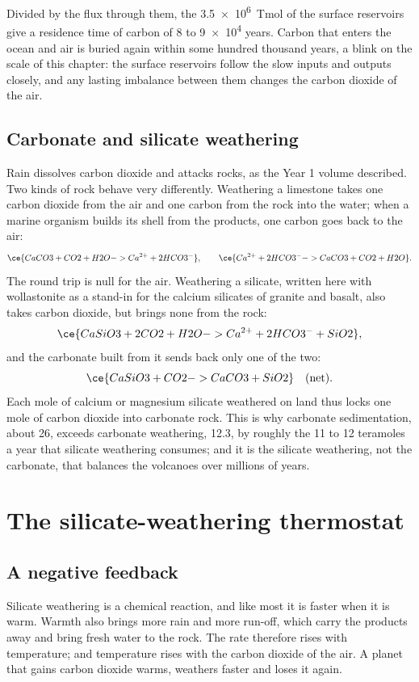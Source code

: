 Divided by the flux through them, the \qty{3.5e6}{Tmol} of the surface reservoirs give a
residence time of carbon of 8 to \num{9e4} years. Carbon that enters the ocean and air is buried
again within some hundred thousand years, a blink on the scale of this chapter: the surface
reservoirs follow the slow inputs and outputs closely, and any lasting imbalance between them
changes the carbon dioxide of the air.

\subsection*{Carbonate and silicate weathering}

Rain dissolves carbon dioxide and attacks rocks, as the Year 1 volume described. Two kinds of rock
behave very differently. Weathering a limestone takes one carbon dioxide from the air and one
carbon from the rock into the water; when a marine organism builds its shell from the products,
one carbon goes back to the air:
\[
  \ce{CaCO3 + CO2 + H2O -> Ca^{2+} + 2 HCO3^-} , \qquad
  \ce{Ca^{2+} + 2 HCO3^- -> CaCO3 + CO2 + H2O} .
\]
The round trip is null for the air. Weathering a silicate, written here with wollastonite as a
stand-in for the calcium silicates of granite and basalt, also takes carbon dioxide, but brings
none from the rock:
\[
  \ce{CaSiO3 + 2 CO2 + H2O -> Ca^{2+} + 2 HCO3^- + SiO2} ,
\]
and the carbonate built from it sends back only one of the two:
\[
  \ce{CaSiO3 + CO2 -> CaCO3 + SiO2} \quad\text{(net)} .
\]
Each mole of calcium or magnesium silicate weathered on land thus locks one mole of carbon dioxide
into carbonate rock. This is why carbonate sedimentation, about 26, exceeds carbonate weathering,
12.3, by roughly the 11 to 12 teramoles a year that silicate weathering consumes; and it is the
silicate weathering, not the carbonate, that balances the volcanoes over millions of years.

\section{The silicate-weathering thermostat}\label{sec:b2:deep-time-climate:thermostat}

\subsection*{A negative feedback}

Silicate weathering is a chemical reaction, and like most it is faster when it is warm. Warmth
also brings more rain and more run-off, which carry the products away and bring fresh water to the
rock. The rate therefore rises with temperature; and temperature rises with the carbon dioxide of
the air. A planet that gains carbon dioxide warms, weathers faster and loses it again.

